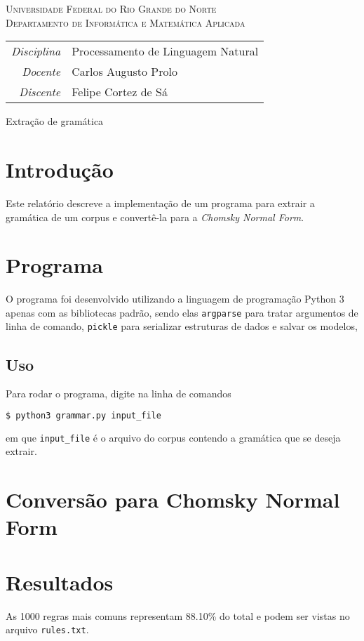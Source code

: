 \documentclass[12pt, a4paper]{article}
\newcommand{\code}[1]{{\lstinline{#1}}}
\begin{document}
\begin{center}
    \textsc{Universidade Federal do Rio Grande do Norte} \\
    \textsc{Departamento de Informática e Matemática Aplicada}
\end{center}

\bigskip

\begin{tabular}{@{}rl@{}}
    \emph{Disciplina} & Processamento de Linguagem Natural \\
    \emph{Docente}    & Carlos Augusto Prolo \\
    \emph{Discente}   & Felipe Cortez de Sá \\
\end{tabular}

\bigskip

\begin{center}
\large Extração de gramática
\end{center}

\section{Introdução}
Este relatório descreve a implementação de um programa para extrair a gramática
de um corpus e convertê-la para a \emph{Chomsky Normal Form}.

\section{Programa}
O programa foi desenvolvido utilizando a linguagem de programação Python 3
apenas com as bibliotecas padrão, sendo elas \code{argparse} para tratar
argumentos de linha de comando, \code{pickle} para serializar estruturas de
dados e salvar os modelos,

\subsection{Uso}
Para rodar o programa, digite na linha de comandos

\begin{lstlisting}[language=bash]
$ python3 grammar.py input_file
\end{lstlisting}

em que \code{input_file} é o arquivo do corpus contendo a gramática que se
deseja extrair.

\section{Conversão para Chomsky Normal Form}

\section{Resultados}
As 1000 regras mais comuns representam 88.10\% do total e podem ser vistas no
arquivo \code{rules.txt}.
\end{document}
